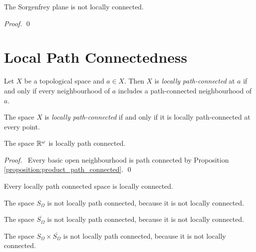 \begin{proposition}
    The Sorgenfrey plane is not locally connected.
\end{proposition}

\begin{proof}
    \pf
    \step{2}{\pick\ $x$, $y$ such that $[0,x) \times [0,y) \subseteq U$}
    \step{3}{$[0,x/2)\times[0,y/2)$ is clopen in $U$.}
    \qed
\end{proof}

\section{Local Path Connectedness}

\begin{definition}
    Let $X$ be a topological space and $a \in X$. Then $X$ is \emph{locally
    path-connected} at $a$ if and only if every neighbourhood of $a$ includes a
    path-connected neighbourhood of $a$.

    The space $X$ is \emph{locally path-connected} if and only if it is locally
    path-connected at every point.
\end{definition}

\begin{proposition}
    The space $\mathbb{R}^\omega$ is locally path connected.
\end{proposition}

\begin{proof}
    \pf\ Every basic open neighbourhood is path connected by
    Proposition \ref{proposition:product_path_connected}. \qed
\end{proof}

\begin{proposition}
    Every locally path connected space is locally connected.
\end{proposition}

\begin{example}
    The space $S_\Omega$ is not locally path connected, because it is not locally connected.
\end{example}

\begin{example}
    The space $\overline{S_\Omega}$ is not locally path connected, because it is not locally connected.
\end{example}

\begin{example}
    The space $S_\Omega \times \overline{S_\Omega}$ is not locally path connected, because it is not locally connected.
\end{example}


